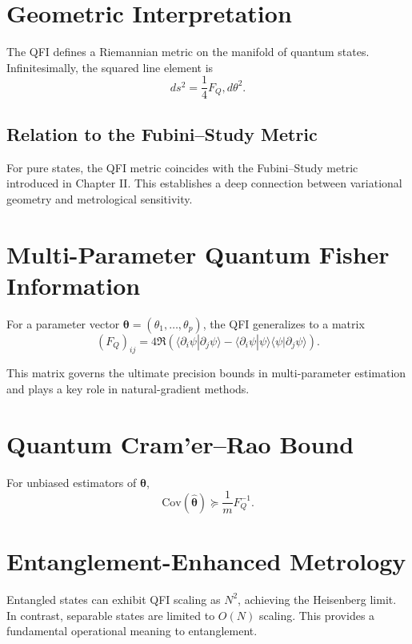 \documentclass{book}
\begin{document}
\section{Geometric Interpretation}

The QFI defines a Riemannian metric on the manifold of quantum states. Infinitesimally, the squared line element is
\begin{equation}
ds^2 = \frac{1}{4} F_Q , d\theta^2.
\end{equation}

\subsection{Relation to the Fubini–Study Metric}

For pure states, the QFI metric coincides with the Fubini–Study metric introduced in Chapter II. This establishes a deep connection between variational geometry and metrological sensitivity.

\section{Multi-Parameter Quantum Fisher Information}

For a parameter vector $\bm\theta = (\theta_1,\dots,\theta_p)$, the QFI generalizes to a matrix
\begin{equation}
(F_Q)_{ij} = 4 \Re \left( \langle \partial_i \psi | \partial_j \psi \rangle - \langle \partial_i \psi | \psi \rangle \langle \psi | \partial_j \psi \rangle \right).
\end{equation}

This matrix governs the ultimate precision bounds in multi-parameter estimation and plays a key role in natural-gradient methods.

\section{Quantum Cram'er–Rao Bound}

For unbiased estimators of $\bm\theta$,
\begin{equation}
\mathrm{Cov}(\hat{\bm\theta}) \succeq \frac{1}{m} F_Q^{-1}.
\end{equation}

\section{Entanglement-Enhanced Metrology}

Entangled states can exhibit QFI scaling as $N^2$, achieving the Heisenberg limit. In contrast, separable states are limited to $O(N)$ scaling. This provides a fundamental operational meaning to entanglement.
\end{document}
